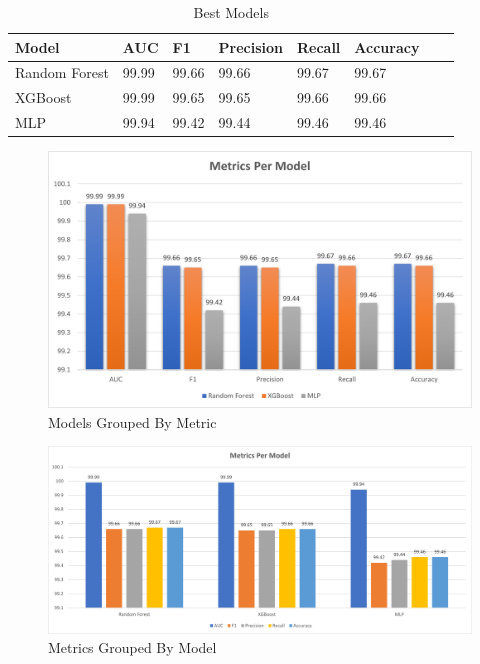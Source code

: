 \begin{table}[h]
\centering
\caption{Best Models}
\label{tab:ml-metrics}
\begin{tabular}{|l|l|l|l|l|l|l|l|}
\hline
\textbf{Model} & \textbf{AUC} & \textbf{F1} & \textbf{Precision} & \textbf{Recall} & \textbf{Accuracy}  \\ \hline
Random Forest & 99.99 & 99.66 & 99.66 & 99.67 & 99.67 \\ \hline
XGBoost & 99.99 & 99.65 & 99.65 & 99.66 & 99.66 \\ \hline
MLP & 99.94 & 99.42 & 99.44 & 99.46 & 99.46 \\ \hline
\end{tabular}
\end{table}

\begin{figure}[H]
    \centering
	\includegraphics[width=\textwidth]{Appendices/Images/Metrics.png}
	\caption{Models Grouped By Metric}
  	\label{fig:model_metrics_graph}
\end{figure}
\begin{figure}[H]
    \centering
	\includegraphics[width=\textwidth]{Appendices/Images/Metrics2.png}
	\caption{Metrics Grouped By Model}
  	\label{fig:model_metrics2_graph}
\end{figure}


